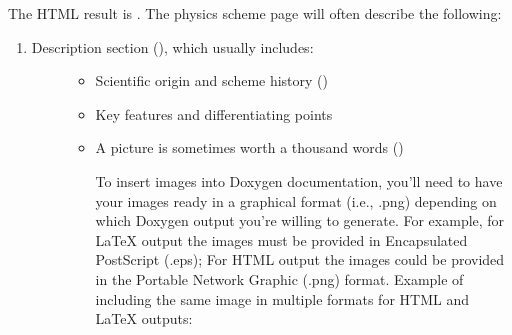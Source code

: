 \documentclass[letterpaper,10pt,english]{sphinxmanual}
\begin{document}
The HTML result is .
The physics scheme page will often describe the following:
\begin{enumerate}
\def\theenumi{\alph{enumi}}
\def\labelenumi{\theenumi .}
\makeatletter\def\p@enumii{\p@enumi \theenumi .}\makeatother
\item {} \begin{description}
\item[{Description section (), which usually includes:}] \leavevmode\begin{itemize}
\item {} 
Scientific origin and scheme history ()

\item {} 
Key features and differentiating points

\item {} 
A picture is sometimes worth a thousand words ()

To insert images into Doxygen documentation, you’ll need to have your
images ready in a graphical format (i.e., .png) depending
on which Doxygen output you’re willing to generate. For example, for LaTeX
output the images must be provided in Encapsulated PostScript (.eps); For
HTML output the images could be provided in the Portable Network Graphic
(.png) format. Example of including the same image in multiple formats for
HTML and LaTeX outputs:

\end{itemize}

\end{description}

\end{enumerate}

\begin{sphinxVerbatim}[commandchars=\\\{\}]
\end{sphinxVerbatim}
\end{document}

